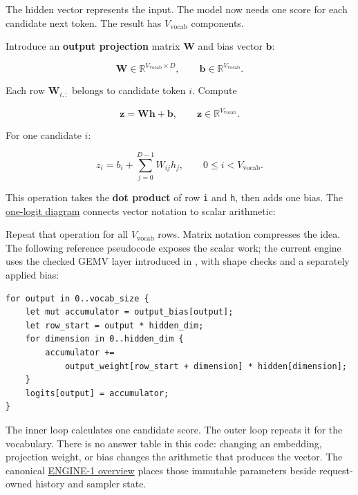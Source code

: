 The hidden vector represents the input. The model now needs one score
for each candidate next token. The result has \(V_{\mathrm{vocab}}\)
components.

Introduce an \textbf{output projection} matrix \(\mathbf{W}\) and bias
vector \(\mathbf{b}\):

\begin{equation}
\mathbf{W}\in\mathbb{R}^{V_{\mathrm{vocab}}\times D},
\qquad \mathbf{b}\in\mathbb{R}^{V_{\mathrm{vocab}}}.
\end{equation}

Each row \(\mathbf{W}_{i,:}\) belongs to candidate token \(i\). Compute

\begin{equation}
\mathbf{z}=\mathbf{W}\mathbf{h}+\mathbf{b},
\qquad \mathbf{z}\in\mathbb{R}^{V_{\mathrm{vocab}}}.
\end{equation}

For one candidate \(i\):

\begin{equation}
z_i=b_i+\sum_{j=0}^{D-1}W_{ij}h_j,
\qquad 0\le i<V_{\mathrm{vocab}}.
\end{equation}

This operation takes the \textbf{dot product} of row \texttt{i} and
\texttt{h}, then adds one bias. The
\href{https://github.com/hermonai/inside-the-llm-engine/blob/astra-visual-rewrite/diagrams/model/one-logit-dot-product.txt}{one-logit
diagram} connects vector notation to scalar arithmetic:


Repeat that operation for all \(V_{\mathrm{vocab}}\) rows. Matrix
notation compresses the idea. The following reference pseudocode exposes
the scalar work; the current engine uses the checked GEMV layer introduced
in , with shape checks and a separately applied bias:

\begin{verbatim}
for output in 0..vocab_size {
    let mut accumulator = output_bias[output];
    let row_start = output * hidden_dim;
    for dimension in 0..hidden_dim {
        accumulator +=
            output_weight[row_start + dimension] * hidden[dimension];
    }
    logits[output] = accumulator;
}
\end{verbatim}

The inner loop calculates one candidate score. The outer loop repeats it
for the vocabulary. There is no answer table in this code: changing an
embedding, projection weight, or bias changes the arithmetic that
produces the vector. The canonical
\href{https://github.com/hermonai/inside-the-llm-engine/blob/astra-visual-rewrite/diagrams/model/engine-1-overview.txt}{ENGINE-1
overview} places those immutable parameters beside request-owned history
and sampler state.

